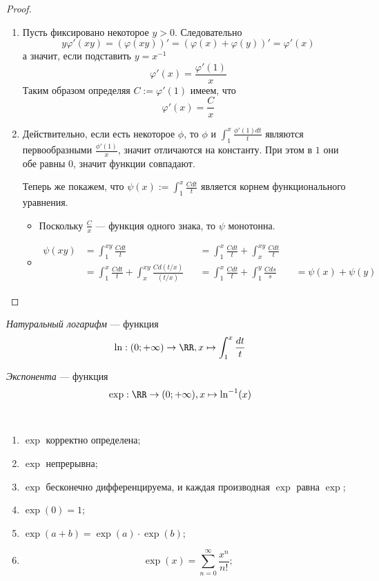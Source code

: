 \documentclass[12pt,a4paper]{article}
\begin{document}
\begin{proof}
\begin{enumerate}
            \item Пусть фиксировано некоторое $y > 0$. Следовательно
                \[y\varphi'(xy) = (\varphi(xy))' = (\varphi(x) + \varphi(y))' = \varphi'(x)\]
                а значит, если подставить $y = x^{-1}$
                \[\varphi'(x) = \frac{\varphi'(1)}{x}\]
                Таким образом определяя $C := \varphi'(1)$ имеем, что
                \[\varphi'(x) = \frac{C}{x}\]
            
            \item Действительно, если есть некоторое $\phi$, то $\phi$ и $\int_1^x \frac{\phi'(1)dt}{t}$ являются первообразными $\frac{\phi'(1)}{x}$, значит отличаются на константу. При этом в $1$ они обе равны $0$, значит функции совпадают.

                Теперь же покажем, что $\psi(x) := \int_1^x \frac{Cdt}{t}$ является корнем функционального уравнения.
                \begin{itemize}
                    \item Поскольку $\frac{C}{x}$ --- функция одного знака, то $\psi$ монотонна.
                    \item
                        \begin{align*}
                            \psi(xy)
                            &= \int_1^{xy} \frac{Cdt}{t}&
                            &= \int_1^x \frac{Cdt}{t} + \int_x^{xy} \frac{Cdt}{t}\\
                            &= \int_1^x \frac{Cdt}{t} + \int_x^{xy} \frac{Cd(t/x)}{(t/x)}&
                            &= \int_1^x \frac{Cdt}{t} + \int_1^{y} \frac{Cds}{s}&
                            &= \psi(x) + \psi(y)
                        \end{align*}
                \end{itemize}
        \end{enumerate}
    \end{proof}

    \begin{definition}
        \emph{Натуральный логарифм} --- функция
        \[\ln: (0; +\infty) \to \RR, x \mapsto \int_1^x \frac{dt}{t}\]

        \emph{Экспонента} --- функция
        \[\exp: \RR \to (0; +\infty), x \mapsto \ln^{-1}(x)\]
    \end{definition}

    \begin{theorem}\ 
        \begin{enumerate}
            \item $\exp$ корректно определена;
            \item $\exp$ непрерывна;
            \item $\exp$ бесконечно дифференцируема, и каждая производная $\exp$ равна $\exp$;
            \item $\exp(0) = 1$;
            \item $\exp(a + b) = \exp(a) \cdot \exp(b)$;
            \item \[\exp(x) = \sum_{n=0}^\infty \frac{x^n}{n!};\]
        \end{enumerate}
    \end{theorem}
\end{document}

